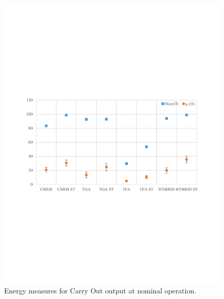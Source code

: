 \documentclass[ecp,tc, english]{iiufrgs}
\begin{document}
\begin{figure}[H]
\centering
\includegraphics[width=\textwidth, trim={0 9cm 0 9cm},clip]{energyNominalCarryOut.pdf}
\caption{Energy measures for Carry Out output at nominal operation.}
\label{fig:Fig48}
\end{figure}
\end{document}
